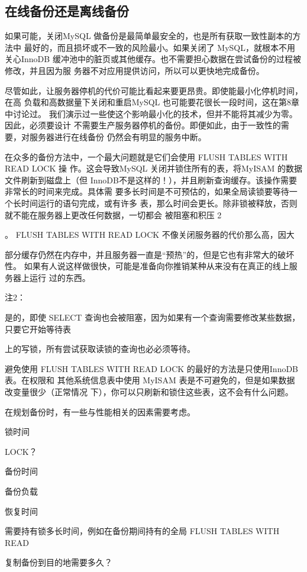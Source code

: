 \subsection{在线备份还是离线备份}
如果可能，关闭MySQL 做备份是最简单最安全的，也是所有获取一致性副本的方法中
最好的，而且损坏或不一致的风险最小。如果关闭了 MySQL，就根本不用关心InnoDB
缓冲池中的脏页或其他缓存。也不需要担心数据在尝试备份的过程被修改，并且因为服
务器不对应用提供访问，所以可以更快地完成备份。

尽管如此，让服务器停机的代价可能比看起来要更昂贵。即使能最小化停机时间，在高
负载和高数据量下关闭和重启MySQL 也可能要花很长一段时间，这在第8章中讨论过。
我们演示过一些使这个影响最小化的技术，但并不能将其减少为零。因此，必须要设计
不需要生产服务器停机的备份。即便如此，由于一致性的需要，对服务器进行在线备份
仍然会有明显的服务中断。

在众多的备份方法中，一个最大问题就是它们会使用 FLUSH TABLES WITH READ LOCK 操
作。这会导致MySQL 关闭并锁住所有的表，将MyISAM 的数据文件刷新到磁盘上（但
InnoDB不是这样的！），并且刷新查询缓存。该操作需要非常长的时间来完成。具体需
要多长时间是不可预估的，如果全局读锁要等待一个长时间运行的语句完成，或有许多
表，那么时间会更长。除非锁被释放，否则就不能在服务器上更改任何数据，一切都会
被阻塞和积压 2

。 FLUSH TABLES WITH READ LOCK 不像关闭服务器的代价那么高，因大

部分缓存仍然在内存中，并且服务器一直是“预热”的，但是它也有非常大的破坏性。
如果有人说这样做很快，可能是准备向你推销某种从来没有在真正的线上服务器上运行
过的东西。

注2：

是的，即使 SELECT 查询也会被阻塞，因为如果有一个查询需要修改某些数据，只要它开始等待表

上的写锁，所有尝试获取读锁的查询也必必须等待。

避免使用 FLUSH TABLES WITH READ LOCK 的最好的方法是只使用InnoDB表。在权限和
其他系统信息表中使用 MyISAM 表是不可避免的，但是如果数据改变量很少（正常情况
下），你可以只刷新和锁住这些表，这不会有什么问题。

在规划备份时，有一些与性能相关的因素需要考虑。

锁时间

LOCK？

备份时间

备份负载

恢复时间

需要持有锁多长时间，例如在备份期间持有的全局 FLUSH TABLES WITH READ

复制备份到目的地需要多久？

